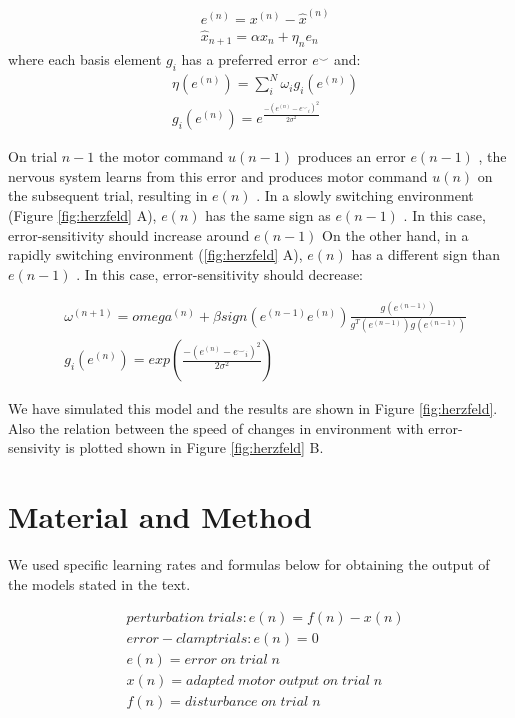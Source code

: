 \documentclass[9pt,twocolumn]{paper-template}
\begin{document}
\begin{eqnarray*}
& e^{(n)} = x^{(n)}-\hat{x}^{(n)}\\
& \hat{x}_{n+1} = \alpha \hat{x}_n + \eta_ne_n
\end{eqnarray*}
where  each basis element $g_i$ has a preferred error $e^\smallsmile$ and:
\begin{eqnarray*}
& \eta(e^{(n)}) = \sum_i^N \omega_ig_i(e^{(n)})\\
&g_i(e^{(n)}) = e^{\frac{-(e^{(n)}-{e^\smallsmile}_i)^2}{2\sigma^2}}
\end{eqnarray*}

On trial $n-1$ the motor command $u(n-1)$ produces an error $e(n-1)$ , the nervous system learns from this error and produces motor command $u (n)$ on the subsequent trial, resulting in $e(n)$ . In a slowly switching environment (Figure \ref{fig:herzfeld} A), $e(n)$ has the same sign as $e(n-1)$ . In this case, error-sensitivity should increase around $e(n-1)$ On the other hand, in a rapidly switching environment (\ref{fig:herzfeld} A), $e(n)$ has a different sign than $e(n-1)$ . In this case, error-sensitivity should decrease:

\begin{eqnarray*}
& \omega^{(n+1)} =omega^{(n)}+\beta sign(e^{(n-1)}e^{(n)}) \frac{g(e^{(n-1)})}{g^T(e^{(n-1)})g(e^{(n-1)})}\\
&g_i(e^{(n)}) = exp(\frac{-(e^{(n)}-{e^\smallsmile}_i)^2}{2\sigma^2})
\end{eqnarray*}

We have simulated this model and the results are shown in Figure \ref{fig:herzfeld}. Also the relation between the speed of changes in environment with error-sensivity is plotted shown in Figure \ref{fig:herzfeld} B. 

\section*{Material and Method}
We used specific learning rates and formulas below for obtaining the output of the models stated in the text.

\begin{eqnarray*}
& perturbation\;trials : e(n)=f(n)-x(n)\\
& error-clamp trials : e(n) = 0\\
& e(n) = error\;on\;trial\;n\\
& x(n) = adapted\;motor\;output\;on\;trial\;n\\
& f(n) = disturbance\;on\;trial\;n
\end{eqnarray*}
\end{document}
